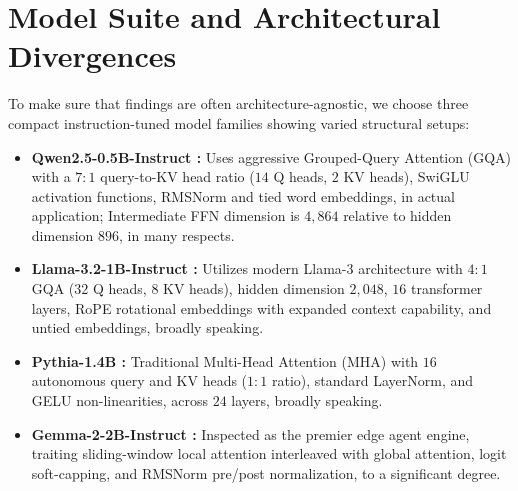 \documentclass[12pt,a4paper,oneside]{report}
\begin{document}
    \section{Model Suite and Architectural Divergences}
    To make sure that findings are often architecture-agnostic, we choose three compact instruction-tuned model families showing varied structural setups:
    \begin{itemize}[leftmargin=*]
        \item \textbf{Qwen2.5-0.5B-Instruct \cite{qwen2024}:} Uses aggressive Grouped-Query Attention (GQA) with a $7:1$ query-to-KV head ratio ($14$ Q heads, $2$ KV heads), SwiGLU activation functions, RMSNorm and tied word embeddings, in actual application; Intermediate FFN dimension is $4,864$ relative to hidden dimension $896$, in many respects.
        \item \textbf{Llama-3.2-1B-Instruct \cite{dubey2024llama}:} Utilizes modern Llama-3 architecture with $4:1$ GQA ($32$ Q heads, $8$ KV heads), hidden dimension $2,048$, $16$ transformer layers, RoPE rotational embeddings with expanded context capability, and untied embeddings, broadly speaking.
        \item \textbf{Pythia-1.4B \cite{biderman2023pythia}:} Traditional Multi-Head Attention (MHA) with $16$ autonomous query and KV heads ($1:1$ ratio), standard LayerNorm, and GELU non-linearities, across $24$ layers, broadly speaking.
        \item \textbf{Gemma-2-2B-Instruct \cite{team2024gemma}:} Inspected as the premier edge agent engine, traiting sliding-window local attention interleaved with global attention, logit soft-capping, and RMSNorm pre/post normalization, to a significant degree.
    \end{itemize}
\end{document}

